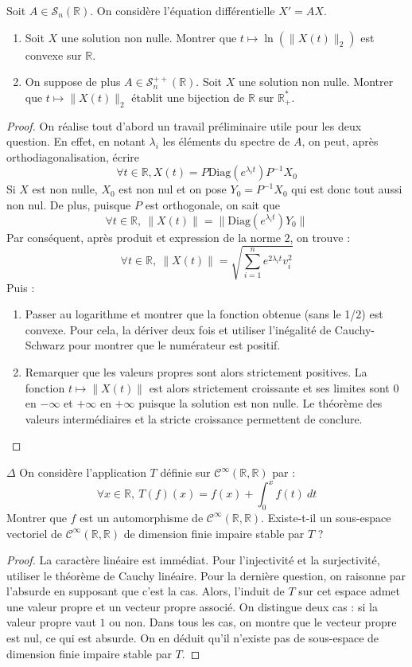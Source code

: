 \documentclass[french,a4paper]{article}
\newcommand{\R}{\mathbb{R}}
\newcommand{\st}{^*}
\newcommand{\inv}{^{-1}}
\theoremstyle{plain}
\theoremstyle{definition}
\theoremstyle{remark}
\begin{document}
\begin{ex}{}
	Soit $A\in\mathcal{S}_n(\R)$. On considère l'équation différentielle $X'=AX$.
	\begin{enumerate}
		\item Soit $X$ une solution non nulle. Montrer que $t\mapsto\ln\left(\lVert X(t)\rVert_2\right)$ est convexe sur $\R$.
		\item On suppose de plus $A\in\mathcal{S}_n^{++}(\R)$. Soit $X$ une solution non nulle. Montrer que $t\mapsto \lVert X(t)\rVert_2$ établit une bijection de $\R$ sur $\R_+\st$.
	\end{enumerate}
\end{ex}
\begin{proof}
	On réalise tout d'abord un travail préliminaire utile pour les deux question. En effet, en notant $\lambda_i$ les éléments du spectre de $A$, on peut, après orthodiagonalisation, écrire $$\forall t\in\R, X(t)=P\text{Diag}(e^{\lambda_i t})P\inv X_0$$ Si $X$ est non nulle, $X_0$ est non nul et on pose $Y_0=P\inv X_0$ qui est donc tout aussi non nul. De plus, puisque $P$ est orthogonale, on sait que $$\forall t\in\R,\ \lVert X(t)\rVert =\lVert \text{Diag}(e^{\lambda_i t})Y_0\rVert$$ Par conséquent, après produit et expression de la norme $2$, on trouve : $$\forall t\in\R,\ \lVert X(t)\rVert=\sqrt{\sum_{i=1}^{n}e^{2\lambda_i t}v_i^2}$$
	Puis :
	\begin{enumerate}
		\item Passer au logarithme et montrer que la fonction obtenue (sans le 1/2) est convexe. Pour cela, la dériver deux fois et utiliser l'inégalité de Cauchy-Schwarz pour montrer que le numérateur est positif.
		\item Remarquer que les valeurs propres sont alors strictement positives. La fonction $t\mapsto\lVert X(t)\rVert$ est alors strictement croissante et ses limites sont $0$ en $-\infty$ et $+\infty$ en $+\infty$ puisque la solution est non nulle. Le théorème des valeurs intermédiaires et la stricte croissance permettent de conclure.
	\end{enumerate}
\end{proof}

\begin{ex}[Moulin.ED.38]{$\Delta$}
	On considère l'application $T$ définie sur $\mathcal{C}^{\infty}(\R,\R)$ par : $$\forall x\in\R,\ T(f)(x)=f(x)+\int_{0}^{x}f(t)\ dt$$ Montrer que $f$ est un automorphisme de $\mathcal{C}^\infty(\R,\R)$. Existe-t-il un sous-espace vectoriel de $\mathcal{C}^\infty(\R,\R)$ de dimension finie impaire stable par $T$ ?
\end{ex}
\begin{proof}
	La caractère linéaire est immédiat. Pour l'injectivité et la surjectivité, utiliser le théorème de Cauchy linéaire. Pour la dernière question, on raisonne par l'absurde en supposant que c'est la cas. Alors, l'induit de $T$ sur cet espace admet une valeur propre et un vecteur propre associé. On distingue deux cas : si la valeur propre vaut $1$ ou non. Dans tous les cas, on montre que le vecteur propre est nul, ce qui est absurde. On en déduit qu'il n'existe pas de sous-espace de dimension finie impaire stable par $T$.
\end{proof}
\end{document}
